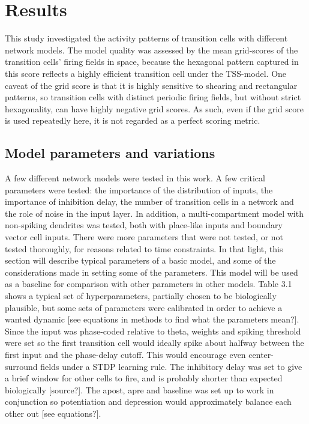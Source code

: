 \documentclass{article}
\begin{document}
    \section{Results}

    This study investigated the activity patterns of transition cells with different network models. The model quality was assessed by the mean grid-scores of the transition cells’ firing fields in space, because the hexagonal pattern captured in this score reflects a highly efficient transition cell under the TSS-model. One caveat of the grid score is that it is highly sensitive to shearing and rectangular patterns, so transition cells with distinct periodic firing fields, but without strict hexagonality, can have highly negative grid scores. As such, even if the grid score is used repeatedly here, it is not regarded as a perfect scoring metric.

    \subsection{Model parameters and variations}
    A few different network models were tested in this work. A few critical parameters were tested: the importance of the distribution of inputs, the importance of inhibition delay, the number of transition cells in a network and the role of noise in the input layer. In addition, a multi-compartment model with non-spiking dendrites was tested, both with place-like inputs and boundary vector cell inputs. There were more parameters that were not tested, or not tested thoroughly, for reasons related to time constraints. In that light, this section will describe typical parameters of a basic model, and some of the considerations made in setting some of the parameters. This model will be used as a baseline for comparison with other parameters in other models.
    Table 3.1 shows a typical set of hyperparameters, partially chosen to be biologically plausible, but some sets of parameters were calibrated in order to achieve a wanted dynamic [see equations in methods to find what the parameters mean?]. Since the input was phase-coded relative to theta, weights and spiking threshold were set so the first transition cell would ideally spike about halfway between the first input and the phase-delay cutoff. This would encourage even center- surround fields under a STDP learning rule. The inhibitory delay was set to give a brief window for other cells to fire, and is probably shorter than expected biologically [source?]. The apost, apre and baseline was set up to work in conjunction so potentiation and depression would approximately balance each other out [see equations?]. 
\end{document}
